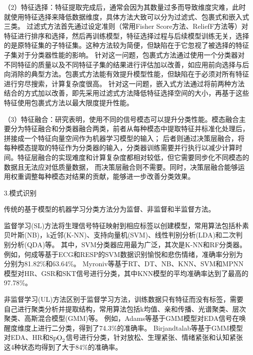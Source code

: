 
（2）特征选择：特征提取完成后，通常会因为其数量过多而导致维度灾难，此时就使用特征选择来降低数据维度，具体方法大致可以分为过滤式、包裹式和嵌入式三类。
过滤式方法首先通过设定准则（常用Fisher Score方法\cite{Boonthong2015}、ReliefF方法\cite{ZhangJianhai2015}等）对特征进行排序和选择，然后再训练模型，特征选择过程与后续模型训练无关，选择的是原特征集的子特征集。这种方法较为简便，但缺陷在于它忽视了被选择的特征子集对于分类器性能的影响。
针对这一问题，包裹式方法通过使用一个分类器对不同特征的质量以及不同特征子集的结果进行评估加以改善，如应用前向选择与后向消除的典型方法。包裹式方法能有效提升模型性能，但缺陷在于必须对所有特征进行穷尽搜索，计算复杂度很高。
针对这一问题，嵌入式方法通过将前两种方法结合的方式加以改善，即先采用过滤式方法降低特征选择空间的大小，再基于这些特征使用包裹式方法以最大限度提升性能。

（3）特征融合：研究表明，使用不同的信号模态可以提升分类性能\cite{DEAP2011}。模态融合主要分为特征融合和分类器融合两类，前者从每种模态中提取特征并标准化处理后，拼接成一个特征向量空间作为机器学习模型的输入；
后者则通过决策层融合，将每种模态提取的特征作为分类器的输入，分类器训练需要并行执行以减少计算时间。特征层融合的实现难度和计算复杂度都相对较低，但它需要同步化不同模态的数据且无法应对低质量数据，
而决策层融合则不需要。同时，决策层融合能够运用权重调整每种模态对结果的贡献\cite{DEAP2011}，能够进一步改善分类效果。


3.模式识别

传统的基于模型的机器学习分类方法分为监督、非监督和半监督方法。

监督学习(SL)方法将生理信号特征映射到相应标签以创建模型，常用算法包括朴素贝叶斯(NB)，k近邻(K-NN)、支持向量机(SVM)、线性判别分析(LDA)和二次判别分析(QDA)等。
其中，SVM分类器应用最为广泛，其次是K-NN和RF分类器。例如，何成等\cite{HeCheng2017}基于ECG和RESP的SVM数据识别愉悦和悲伤情绪，准确率分别为分别为81.82\%和63.64\%。
Myroniv等\cite{Myroniv2017}基于RT、DT、NB、KNN、SVM和MPNN模型对HR、GSR和SKT信号进行分类，其中KNN模型的平均准确率达到了最高的97.78\%。

非监督学习(UL)方法区别于监督学习方法，训练数据只有特征而没有标签，需要自己进行聚类分析并提取结构，常用算法包括k均值、亲和传播、光谱聚类、层次聚类、高斯混合模型(GMM)等。
例如，Adams等\cite{Adams2014}基于GMM模型对EDA信号在唤醒度维度上进行二分类，得到了74.3\%的准确率。
Birjandtalab等\cite{Birjandtalab2016}基于GMM模型对EDA、HR和${\rm SpO}_{\rm 2}$信号进行分类，针对放松、生理紧张、情绪紧张和认知紧张这4种状态均得到了大于84\%的准确率。

